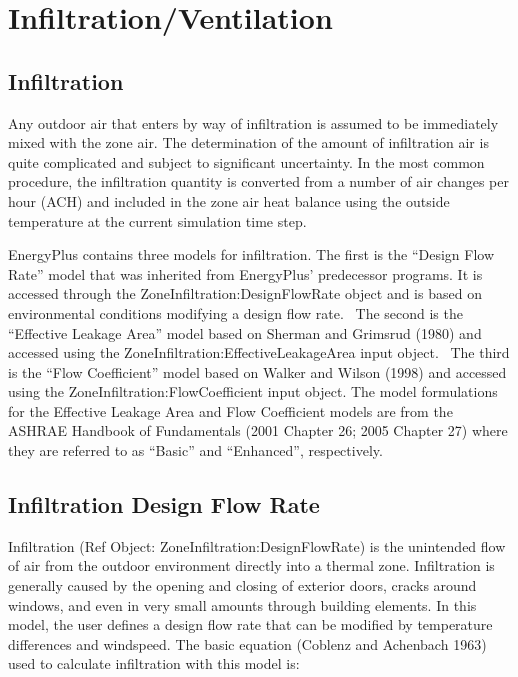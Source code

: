 \section{Infiltration/Ventilation}\label{infiltrationventilation}

\subsection{Infiltration}\label{infiltration}

Any outdoor air that enters by way of infiltration is assumed to be immediately mixed with the zone air. The determination of the amount of infiltration air is quite complicated and subject to significant uncertainty. In the most common procedure, the infiltration quantity is converted from a number of air changes per hour (ACH) and included in the zone air heat balance using the outside temperature at the current simulation time step.

EnergyPlus contains three models for infiltration. The first is the ``Design Flow Rate'' model that was inherited from EnergyPlus' predecessor programs. It is accessed through the ZoneInfiltration:DesignFlowRate object and is based on environmental conditions modifying a design flow rate.~ The second is the ``Effective Leakage Area'' model based on Sherman and Grimsrud (1980) and accessed using the ZoneInfiltration:EffectiveLeakageArea input object.~ The third is the ``Flow Coefficient'' model based on Walker and Wilson (1998) and accessed using the ZoneInfiltration:FlowCoefficient input object. The model formulations for the Effective Leakage Area and Flow Coefficient models are from the ASHRAE Handbook of Fundamentals (2001 Chapter 26; 2005 Chapter 27) where they are referred to as ``Basic'' and ``Enhanced'', respectively.

\subsection{Infiltration Design Flow Rate}\label{infiltration-design-flow-rate}

Infiltration (Ref Object: ZoneInfiltration:DesignFlowRate) is the unintended flow of air from the outdoor environment directly into a thermal zone. Infiltration is generally caused by the opening and closing of exterior doors, cracks around windows, and even in very small amounts through building elements. In this model, the user defines a design flow rate that can be modified by temperature differences and windspeed. The basic equation (Coblenz and Achenbach 1963) used to calculate infiltration with this model is:

